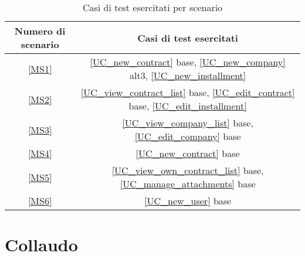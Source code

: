 \begin{table}[h]
\label{macro_scenari}
\caption{Casi di test esercitati per scenario}
\centering
  \begin{tabular}{| c | c |} 
    \hline
    Numero di scenario & Casi di test esercitati \\
    \hline
    \ref{MS1} & \ref{UC_new_contract} base, \ref{UC_new_company} alt3, \ref{UC_new_installment}\\
    \hline
    \ref{MS2} & \ref{UC_view_contract_list} base, \ref{UC_edit_contract} base, \ref{UC_edit_installment} \\
    \hline
    \ref{MS3} & \ref{UC_view_company_list} base, \ref{UC_edit_company} base \\
    \hline
    \ref{MS4} & \ref{UC_new_contract} base\\
    \hline
    \ref{MS5} & \ref{UC_view_own_contract_list} base, \ref{UC_manage_attachments} base\\
    \hline
    \ref{MS6} & \ref{UC_new_user} base\\
    \hline
  \end{tabular} 

\end{table} 

\section{Collaudo}

